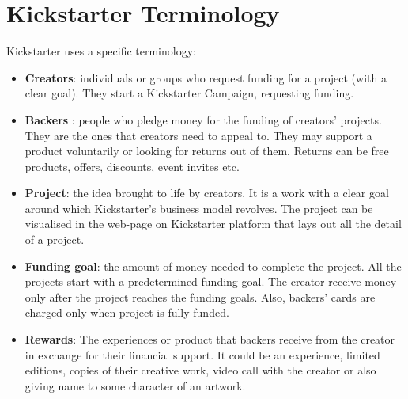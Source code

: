 \documentclass{report}
\begin{document}
\section{Kickstarter Terminology}\label{terminology}
Kickstarter uses a specific terminology:
\begin{itemize}
    \item \textbf{Creators}: individuals or groups who request funding for a project (with a clear goal). They start a Kickstarter Campaign, requesting funding. 
    \item \textbf{Backers} : people who pledge money for the funding of creators' projects. They are the ones that creators need to appeal to. They may support a product voluntarily or looking for returns out of them. Returns can be free products, offers, discounts, event invites etc.
    \item \textbf{Project}: the idea brought to life by creators. It is a work with a clear goal around which Kickstarter's business model revolves. The project can be visualised in the web-page on Kickstarter platform that lays out all the detail of a project.
    \item \textbf{Funding goal}: the amount of money needed to complete the project. All the projects start with a predetermined funding goal. The creator receive money only after the project reaches the funding goals. Also, backers' cards are charged only when project is fully funded.
    \item \textbf{Rewards}: The experiences or product that backers receive from the creator in exchange for their financial support. It could be an experience, limited editions, copies of their creative work, video call with the creator or also giving name to some character of an artwork. 
\end{itemize}
\end{document}
